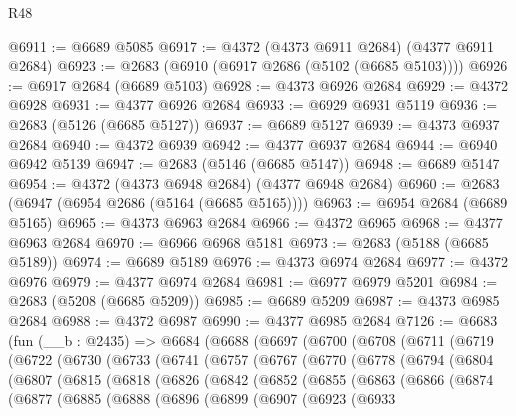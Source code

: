 \begin{lexlean}{R48}
\begin{coremodule}
@6911 := @6689 @5085
@6917 := @4372 (@4373 @6911 @2684) (@4377 @6911 @2684)
@6923 := @2683 (@6910 (@6917 @2686 (@5102 (@6685 @5103))))
@6926 := @6917 @2684 (@6689 @5103)
@6928 := @4373 @6926 @2684
@6929 := @4372 @6928
@6931 := @4377 @6926 @2684
@6933 := @6929 @6931 @5119
@6936 := @2683 (@5126 (@6685 @5127))
@6937 := @6689 @5127
@6939 := @4373 @6937 @2684
@6940 := @4372 @6939
@6942 := @4377 @6937 @2684
@6944 := @6940 @6942 @5139
@6947 := @2683 (@5146 (@6685 @5147))
@6948 := @6689 @5147
@6954 := @4372 (@4373 @6948 @2684) (@4377 @6948 @2684)
@6960 := @2683 (@6947 (@6954 @2686 (@5164 (@6685 @5165))))
@6963 := @6954 @2684 (@6689 @5165)
@6965 := @4373 @6963 @2684
@6966 := @4372 @6965
@6968 := @4377 @6963 @2684
@6970 := @6966 @6968 @5181
@6973 := @2683 (@5188 (@6685 @5189))
@6974 := @6689 @5189
@6976 := @4373 @6974 @2684
@6977 := @4372 @6976
@6979 := @4377 @6974 @2684
@6981 := @6977 @6979 @5201
@6984 := @2683 (@5208 (@6685 @5209))
@6985 := @6689 @5209
@6987 := @4373 @6985 @2684
@6988 := @4372 @6987
@6990 := @4377 @6985 @2684
@7126 := @6683
    (fun (__b : @2435) =>
    @6684
      (@6688
        (@6697
          (@6700
            (@6708
              (@6711
                (@6719
                  (@6722
                    (@6730
                      (@6733
                        (@6741
                          (@6757
                            (@6767
                              (@6770
                                (@6778
                                  (@6794
                                    (@6804
                                      (@6807
                                        (@6815
                                          (@6818
                                            (@6826
                                              (@6842
                                                (@6852
                                                  (@6855
                                                    (@6863
                                                      (@6866
                                                        (@6874
                                                          (@6877
                                                            (@6885
                                                              (@6888
                                                                (@6896
                                                                  (@6899
                                                                    (@6907
                                                                      (@6923
                                                                        (@6933

\end{coremodule}
\end{lexlean}
